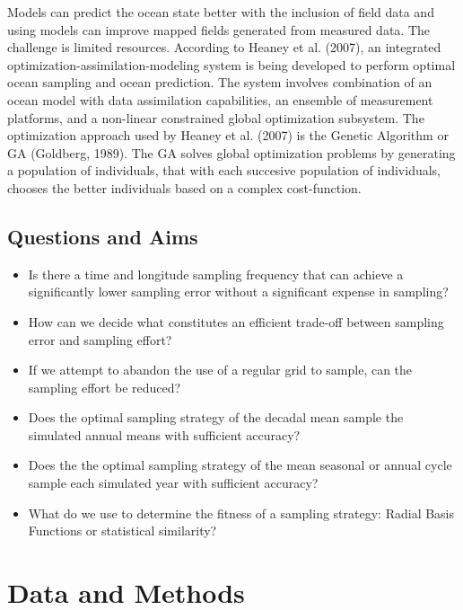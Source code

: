 \documentclass[11pt, a4paper]{article}
\numberwithin{figure}{section}
\numberwithin{table}{section}
\begin{document}
Models can predict the ocean state better with the inclusion of field data and 
using models can improve mapped fields generated from measured data.
The challenge is limited resources. 
According to Heaney et al. (2007), an integrated 
optimization-assimilation-modeling system is being developed to perform optimal 
ocean sampling and ocean prediction. The system involves combination of an 
ocean model with data assimilation capabilities, an ensemble of measurement 
platforms, and a non-linear constrained global optimization subsystem. 
The optimization approach used by Heaney et al. (2007) is the Genetic 
Algorithm or GA (Goldberg, 1989).
The GA solves global optimization problems by generating a population of 
individuals, that with each succesive population of individuals, chooses the 
better individuals based on a complex cost-function.


		
\subsection{Questions and Aims}
\begin{itemize}
\item Is there a time and longitude sampling frequency that can achieve a significantly
lower sampling error without a significant expense in sampling?

\item How can we decide what constitutes an efficient trade-off between sampling error
and sampling effort?

\item If we attempt to abandon the use of a regular grid to sample, can the sampling
effort be reduced?

\item Does the optimal sampling strategy of the decadal mean sample the simulated 
annual means with sufficient accuracy?

\item Does the the optimal sampling strategy of the mean seasonal or annual cycle 
sample each simulated year with sufficient accuracy?

\item What do we use to determine the fitness of a sampling strategy:
Radial Basis Functions or statistical similarity?
\end{itemize}
\newpage

\section{Data and Methods}
\end{document}

